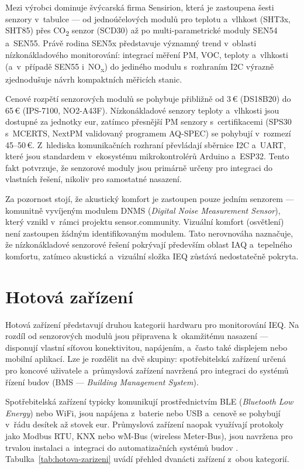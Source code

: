 Mezi výrobci dominuje švýcarská firma Sensirion, která je zastoupena šesti senzory v~tabulce --- od jednoúčelových modulů pro teplotu a~vlhkost (SHT3x, SHT85) přes CO\textsubscript{2} senzor (SCD30) až po multi-parametrické moduly SEN54 a~SEN55. Právě rodina SEN5x představuje významný trend v~oblasti nízkonákladového monitorování: integrací měření PM, VOC, teploty a~vlhkosti (a~v~případě SEN55 i~NO\textsubscript{x}) do jediného modulu s~rozhraním I2C výrazně zjednodušuje návrh kompaktních měřicích stanic.

Cenové rozpětí senzorových modulů se pohybuje přibližně od 3\,€ (DS18B20) do 65\,€ (IPS-7100, NO2-A43F). Nízkonákladové senzory teploty a~vlhkosti jsou dostupné za jednotky eur, zatímco přesnější PM senzory s~certifikacemi (SPS30 s~MCERTS, NextPM validovaný programem AQ-SPEC) se pohybují v~rozmezí 45--50\,€. Z~hlediska komunikačních rozhraní převládají sběrnice I2C a~UART, které jsou standardem v~ekosystému mikrokontrolérů Arduino a~ESP32. Tento fakt potvrzuje, že senzorové moduly jsou primárně určeny pro integraci do vlastních řešení, nikoliv pro samostatné nasazení.

Za pozornost stojí, že akustický komfort je zastoupen pouze jedním senzorem --- komunitně vyvíjeným modulem DNMS (\textit{Digital Noise Measurement Sensor}), který vznikl v~rámci projektu sensor.community. Vizuální komfort (osvětlení) není zastoupen žádným identifikovaným modulem. Tato nerovnováha naznačuje, že nízkonákladové senzorové řešení pokrývají především oblast IAQ a~tepelného komfortu, zatímco akustická a~vizuální složka IEQ zůstává nedostatečně pokryta.

\FloatBarrier
\section{Hotová zařízení}
\label{subsec:hotova-zarizeni}

Hotová zařízení představují druhou kategorii hardwaru pro monitorování IEQ. Na rozdíl od senzorových modulů jsou připravena k~okamžitému nasazení --- disponují vlastní síťovou konektivitou, napájením, a~často také displejem nebo mobilní aplikací. Lze je rozdělit na dvě skupiny: spotřebitelská zařízení určená pro koncové uživatele a~průmyslová zařízení navržená pro integraci do systémů řízení budov (BMS --- \textit{Building Management System}).

Spotřebitelská zařízení typicky komunikují prostřednictvím BLE (\textit{Bluetooth Low Energy}) nebo WiFi, jsou napájena z~baterie nebo USB a~cenově se pohybují v~řádu desítek až stovek eur. Průmyslová zařízení naopak využívají protokoly jako Modbus RTU, KNX nebo wM-Bus (wireless Meter-Bus), jsou navržena pro trvalou instalaci a~integraci do automatizačních systémů budov \parencite{siemensSensorOverviewBrochure2024}. Tabulka~\ref{tab:hotova-zarizeni} uvádí přehled dvanácti zařízení z~obou kategorií.

